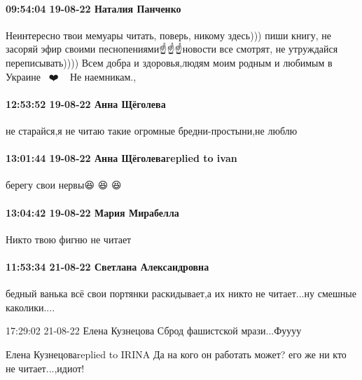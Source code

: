  
 
 
 
 

\paragraph{09:54:04 19-08-22 Наталия Панченко}

Неинтересно твои мемуары читать, поверь, никому здесь))) пиши книгу, не засоряй
эфир своими песнопениями☝️☝️☝️новости все смотрят, не утруждайся переписывать))))
Всем добра и здоровья,людям моим родным и любимым в Украине🥰🥰🥰❤️🤗🤗🤗 Не
наемникам.,

\paragraph{12:53:52 19-08-22 Анна Щёголева}

не старайся,я не читаю такие огромные бредни-простыни,не люблю

\paragraph{13:01:44 19-08-22 Анна Щёголеваreplied to ivan}

берегу свои нервы😆 😆 😆

\paragraph{13:04:42 19-08-22 Мария Мирабелла}

Никто твою фигню не читает🤣🤣🤣

\paragraph{11:53:34 21-08-22 Светлана Александровна}

бедный ванька всё свои портянки раскидывает,а их никто не читает...ну смешные
каколики....

17:29:02 21-08-22
Елена Кузнецова
Сброд фашистской мрази...Фуууу

Елена Кузнецоваreplied to IRINA
Да на кого он работать может? его же ни кто не читает...,идиот!
